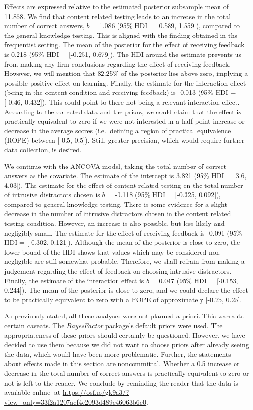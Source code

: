 \documentclass[../main.tex]{subfiles}
\begin{document}
Effects are expressed relative to the estimated posterior subsample mean
of 11.868. We find that content related testing leads to an increase in
the total number of correct answers, \(b\) = 1.086 (95\% HDI = {[}0.589,
1.559{]}), compared to the general knowledge testing. This is aligned
with the finding obtained in the frequentist setting. The mean of the
posterior for the effect of receiving feedback is 0.218 (95\% HDI =
{[}-0.251, 0.679{]}). The HDI around the estimate prevents us from
making any firm conclusions regarding the effect of receiving feedback.
However, we will mention that 82.25\% of the posterior lies above zero,
implying a possible positive effect on learning. Finally, the estimate
for the interaction effect (being in the content condition and receiving
feedback) is -0.013 (95\% HDI = {[}-0.46, 0.432{]}). This could point to
there not being a relevant interaction effect. According to the
collected data and the priors, we could claim that the effect is
practically equivalent to zero if we were not interested in a half-point
increase or decrease in the average scores (i.e.~defining a region of
practical equivalence (ROPE) between {[}-0.5, 0.5{]}). Still, greater
precision, which would require further data collection, is desired.

We continue with the ANCOVA model, taking the total number of correct
answers as the covariate. The estimate of the intercept is 3.821 (95\%
HDI = {[}3.6, 4.03{]}). The estimate for the effect of content related
testing on the total number of intrusive distractors chosen is \(b\) =
-0.118 (95\% HDI = {[}-0.325, 0.092{]}), compared to general knowledge
testing. There is some evidence for a slight decrease in the number of
intrusive distractors chosen in the content related testing condition.
However, an increase is also possible, but less likely and negligibly
small. The estimate for the effect of receiving feedback is -0.091 (95\%
HDI = {[}-0.302, 0.121{]}). Although the mean of the posterior is close
to zero, the lower bound of the HDI shows that values which may be
considered non-negligible are still somewhat probable. Therefore, we
shall refrain from making a judgement regarding the effect of feedback
on choosing intrusive distractors. Finally, the estimate of the
interaction effect is \(b\) = 0.047 (95\% HDI = {[}-0.153, 0.244{]}).
The mean of the posterior is close to zero, and we could declare the
effect to be practically equivalent to zero with a ROPE of approximately
{[}-0.25, 0.25{]}.

As previously stated, all these analyses were not planned a priori. This
warrants certain caveats. The \textit{BayesFactor} package's default
priors were used. The appropriateness of these priors should certainly
be questioned. However, we have decided to use them because we did not
want to choose priors after already seeing the data, which would have
been more problematic. Further, the statements about effects made in
this section are noncommittal. Whether a 0.5 increase or decrease in the
total number of correct answers is practically equivalent to zero or not
is left to the reader. We conclude by reminding the reader that the data
is available online, at
\url{https://osf.io/gk9a3/?view_only=33f2a1207acf4e2093d489e46063b6e0}.
\end{document}

